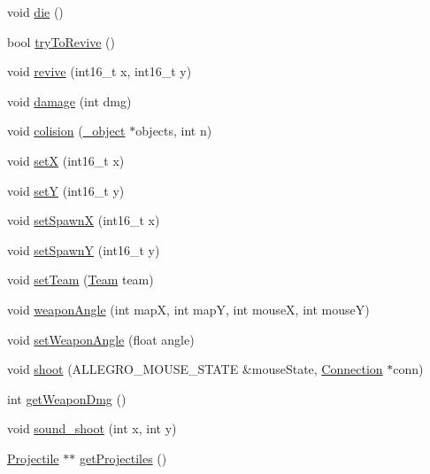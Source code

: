 \begin{DoxyCompactItemize}
void \hyperlink{class_c_character_adc71f8353440b2d5450938fa7c418aa7}{die} ()
\item 
bool \hyperlink{class_c_character_afe8285dd94fc52c099fb548840bc4e06}{try\+To\+Revive} ()
\item 
void \hyperlink{class_c_character_ad33d632d180cc5d487b0c39925caf278}{revive} (int16\+\_\+t x, int16\+\_\+t y)
\item 
void \hyperlink{class_c_character_a68c347ad267792fbed8ee9b1bae90967}{damage} (int dmg)
\item 
void \hyperlink{class_c_character_a84b44c9ef54291da3e28fb7f9dc05f20}{colision} (\hyperlink{struct__object}{\+\_\+object} $\ast$objects, int n)
\item 
void \hyperlink{class_c_character_a6d92d81e7bd039572e147ebe190fab6c}{set\+X} (int16\+\_\+t x)
\item 
void \hyperlink{class_c_character_a670de9c2ba79b716953a1dac2db9e4cf}{set\+Y} (int16\+\_\+t y)
\item 
void \hyperlink{class_c_character_abbabbe227437ea99b377e33c569da84c}{set\+Spawn\+X} (int16\+\_\+t x)
\item 
void \hyperlink{class_c_character_a0060a9e93f32488b4496545b9b3ef593}{set\+Spawn\+Y} (int16\+\_\+t y)
\item 
void \hyperlink{class_c_character_a4af37bf96b4950b67a538d1f5c1bc075}{set\+Team} (\hyperlink{_enums_8hpp_a9c13bb5b1d69698f9b47900990eaa598}{Team} team)
\item 
void \hyperlink{class_c_character_af64ec95c078f3e969cb6b961db81a488}{weapon\+Angle} (int map\+X, int map\+Y, int mouse\+X, int mouse\+Y)
\item 
void \hyperlink{class_c_character_a8aff509bd2bc8cb3eb7c3847533a3aed}{set\+Weapon\+Angle} (float angle)
\item 
void \hyperlink{class_c_character_a5fa507c6196ecc4132796dc250d7bb1d}{shoot} (A\+L\+L\+E\+G\+R\+O\+\_\+\+M\+O\+U\+S\+E\+\_\+\+S\+T\+A\+T\+E \&mouse\+State, \hyperlink{class_connection}{Connection} $\ast$conn)
\item 
int \hyperlink{class_c_character_ac7fd4192681975f1c1adf9933a7193b4}{get\+Weapon\+Dmg} ()
\item 
void \hyperlink{class_c_character_a98f733c8be0661e5e6b306d37a1dfeb5}{sound\+\_\+shoot} (int x, int y)
\item 
\hyperlink{class_projectile}{Projectile} $\ast$$\ast$ \hyperlink{class_c_character_a514a9a531863fe5ba308ec5805111e48}{get\+Projectiles} ()
\end{DoxyCompactItemize}


